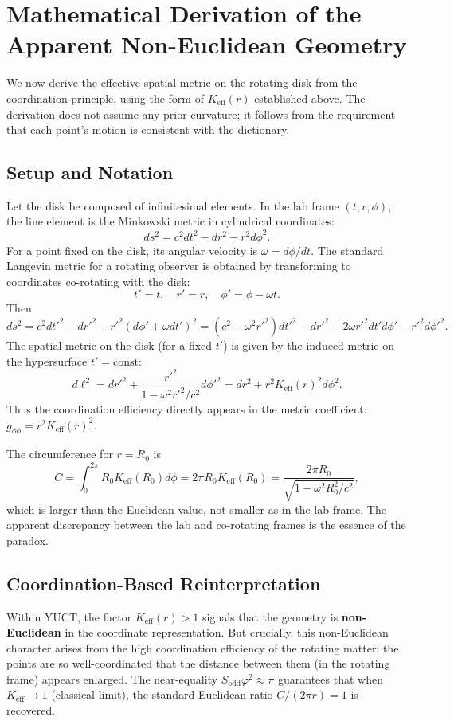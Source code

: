 \documentclass[12pt,a4paper]{article}
\newcommand{\Sodd}{S_{\mathrm{odd}}}
\begin{document}
	\section{Mathematical Derivation of the Apparent Non-Euclidean Geometry}
	\label{sec:derivation}
	
	We now derive the effective spatial metric on the rotating disk from the coordination principle, using the form of \(K_{\mathrm{eff}}(r)\) established above. The derivation does not assume any prior curvature; it follows from the requirement that each point's motion is consistent with the dictionary.
	
	\subsection{Setup and Notation}
	Let the disk be composed of infinitesimal elements. In the lab frame \((t, r, \phi)\), the line element is the Minkowski metric in cylindrical coordinates:
	\[
	ds^2 = c^2 dt^2 - dr^2 - r^2 d\phi^2.
	\]
	For a point fixed on the disk, its angular velocity is \(\omega = d\phi/dt\). The standard Langevin metric for a rotating observer is obtained by transforming to coordinates co-rotating with the disk:
	\[
	t' = t,\quad r' = r,\quad \phi' = \phi - \omega t.
	\]
	Then
	\[
	ds^2 = c^2 dt'^2 - dr'^2 - r'^2 (d\phi' + \omega dt')^2 = (c^2 - \omega^2 r'^2) dt'^2 - dr'^2 - 2\omega r'^2 dt' d\phi' - r'^2 d\phi'^2.
	\]
	The spatial metric on the disk (for a fixed \(t'\)) is given by the induced metric on the hypersurface \(t' = \text{const}\):
	\[
	d\ell^2 = dr'^2 + \frac{r'^2}{1 - \omega^2 r'^2/c^2} d\phi'^2 = dr^2 + r^2 K_{\mathrm{eff}}(r)^2 d\phi^2.
	\]
	Thus the coordination efficiency directly appears in the metric coefficient: \(g_{\phi\phi} = r^2 K_{\mathrm{eff}}(r)^2\).
	
	The circumference for \(r = R_0\) is
	\[
	C = \int_0^{2\pi} R_0 K_{\mathrm{eff}}(R_0) d\phi = 2\pi R_0 K_{\mathrm{eff}}(R_0) = \frac{2\pi R_0}{\sqrt{1 - \omega^2 R_0^2/c^2}},
	\]
	which is larger than the Euclidean value, not smaller as in the lab frame. The apparent discrepancy between the lab and co-rotating frames is the essence of the paradox.
	
	\subsection{Coordination-Based Reinterpretation}
	Within YUCT, the factor \(K_{\mathrm{eff}}(r) > 1\) signals that the geometry is \textbf{non-Euclidean} in the coordinate representation. But crucially, this non-Euclidean character arises from the high coordination efficiency of the rotating matter: the points are so well-coordinated that the distance between them (in the rotating frame) appears enlarged. The near‑equality \(\Sodd \varphi^2 \approx \pi\) guarantees that when \(K_{\mathrm{eff}} \to 1\) (classical limit), the standard Euclidean ratio \(C/(2\pi r) = 1\) is recovered.
	
\end{document}
